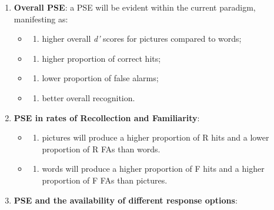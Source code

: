 \documentclass[
  11pt,
]{article}
\providecommand{\tightlist}{%
  \setlength{\itemsep}{0pt}\setlength{\parskip}{0pt}}
\begin{document}
\begin{enumerate}
\def\labelenumi{\arabic{enumi}.}
\tightlist
\item
  \textbf{Overall PSE}: a PSE will be evident within the current
  paradigm, manifesting as:

  \begin{itemize}
  \item
    \begin{enumerate}
    \def\labelenumii{\roman{enumii})}
    \tightlist
    \item
      higher overall \emph{d'} scores for pictures compared to words;
    \end{enumerate}
  \item
    \begin{enumerate}
    \def\labelenumii{\roman{enumii})}
    \setcounter{enumii}{1}
    \tightlist
    \item
      higher proportion of correct hits;
    \end{enumerate}
  \item
    \begin{enumerate}
    \def\labelenumii{\roman{enumii})}
    \setcounter{enumii}{2}
    \tightlist
    \item
      lower proportion of false alarms;
    \end{enumerate}
  \item
    \begin{enumerate}
    \def\labelenumii{\roman{enumii})}
    \setcounter{enumii}{3}
    \tightlist
    \item
      better overall recognition.
    \end{enumerate}
  \end{itemize}
\item
  \textbf{PSE in rates of Recollection and Familiarity}:

  \begin{itemize}
  \item
    \begin{enumerate}
    \def\labelenumii{\roman{enumii})}
    \tightlist
    \item
      pictures will produce a higher proportion of R hits and a lower
      proportion of R FAs than words.
    \end{enumerate}
  \item
    \begin{enumerate}
    \def\labelenumii{\roman{enumii})}
    \setcounter{enumii}{1}
    \tightlist
    \item
      words will produce a higher proportion of F hits and a higher
      proportion of F FAs than pictures.
    \end{enumerate}
  \end{itemize}
\item
  \textbf{PSE and the availability of different response options}:


\end{enumerate}
\end{document}
